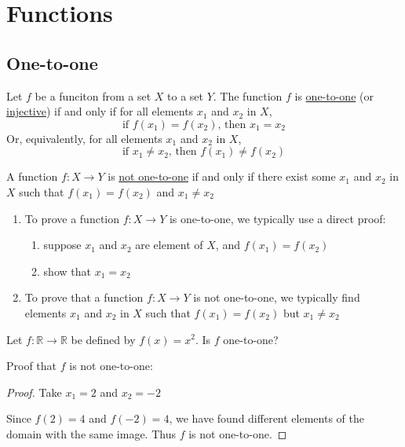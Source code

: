 \section{Functions}
\subsection{One-to-one}
\begin{definition}
    Let $f$ be a funciton from a set $X$ to a set $Y$. The function $f$ is \underline{one-to-one} (or \underline{injective}) if and only if for all elements $x_1$ and $x_2$ in $X$, $$\text{if } f(x_1) = f(x_2),\,\text{then } x_1 = x_2$$
    Or, equivalently, for all elements $x_1$ and $x_2$ in $X$, $$\text{if } x_1 \neq x_2,\,\text{then } f(x_1) \neq f(x_2)$$

    A function $f: X\rightarrow Y$ is \underline{not one-to-one} if and only if there exist some $x_1$ and $x_2$ in $X$ such that $f(x_1) = f(x_2)$ and $x_1 \neq x_2$
\end{definition}

\begin{enumerate}
\item To prove a function $f: X\rightarrow Y$ is one-to-one, we typically use a direct proof: \begin{enumerate}
    \item suppose $x_1$ and $x_2$ are element of $X$, and $f(x_1) = f(x_2)$
    \item show that $x_1 = x_2$
\end{enumerate}

\item To prove that a function $f: X\rightarrow Y$ is not one-to-one, we typically find elements $x_1$ and $x_2$ in $X$ such that $f(x_1) = f(x_2)$ but $x_1 \neq x_2$
\end{enumerate}

\begin{example}
    Let $f: \mathbb R \rightarrow \mathbb R$ be defined by $f(x) = x^2$. Is $f$ one-to-one?

    Proof that $f$ is not one-to-one:
    \begin{proof}
        Take $x_1 = 2$ and $x_2 = -2$

        Since $f(2) = 4$ and $f(-2) = 4$, we have found different elements of the domain with the same image. Thus $f$ is not one-to-one.
    \end{proof}
\end{example}

